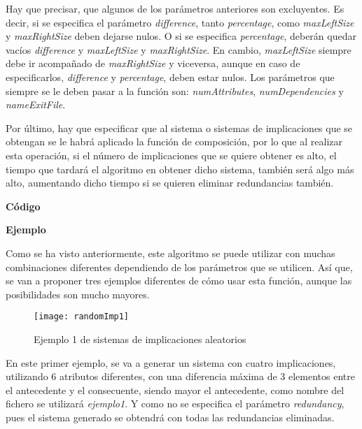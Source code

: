     Hay que precisar, que algunos de los par\'ametros anteriores son excluyentes. Es decir, si se especifica el par\'ametro \textit{difference}, tanto 
    \textit{percentage}, como \textit{maxLeftSize} y \textit{maxRightSize} deben dejarse nulos. O si se especifica \textit{percentage}, deber\'an quedar vac\'ios \textit{difference} y 
    \textit{maxLeftSize} y \textit{maxRightSize}. 
    En cambio, \textit{maxLeftSize} siempre debe ir acompa\~nado de \textit{maxRightSize} y viceversa, aunque en caso de especificarlos, \textit{difference} y \textit{percentage}, 
    deben estar nulos.
    Los par\'ametros que siempre se le deben pasar a la funci\'on son: \textit{numAttributes}, \textit{numDependencies} y \textit{nameExitFile}.

    Por \'ultimo, hay que especificar que al sistema o sistemas de implicaciones que se obtengan se le habr\'a aplicado 
    la funci\'on de composici\'on, por lo que al realizar esta operaci\'on, si el n\'umero de implicaciones que se quiere obtener es 
    alto, el tiempo que tardar\'a el algoritmo en obtener dicho sistema, tambi\'en ser\'a algo m\'as alto, aumentando dicho tiempo si se quieren 
    eliminar redundancias tambi\'en.
    \\

    \bigskip

    \textbf{C\'odigo}

    
    \bigskip


    \textbf{Ejemplo}

    Como se ha visto anteriormente, este algoritmo se puede utilizar con muchas combinaciones diferentes dependiendo de los par\'ametros 
    que se utilicen. As\'i que, se van a proponer tres ejemplos diferentes de c\'omo usar esta funci\'on, aunque las posibilidades 
    son mucho mayores.

    \bigskip

    \begin{figure}[H]
        \centering
        \texttt{[image: randomImp1]}
        \caption{Ejemplo 1 de sistemas de implicaciones aleatorios}
        \label{fig:randomImp1}
    \end{figure}

    En este primer ejemplo, se va a generar un sistema con cuatro implicaciones, utilizando 6 atributos diferentes, con una diferencia m\'axima 
    de 3 elementos entre el antecedente y el consecuente, siendo mayor el antecedente, como nombre del fichero se utilizar\'a \textit{ejemplo1}. 
    Y como no se especifica el par\'ametro \textit{redundancy}, pues el sistema generado se obtendr\'a con todas las redundancias eliminadas.
    
